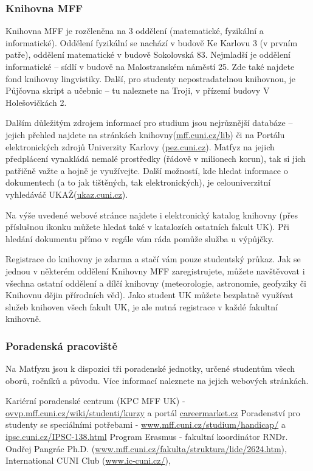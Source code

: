 \subsubsection{Knihovna MFF}
Knihovna MFF je rozčleněna na 3 oddělení (matematické, fyzikální a
informatické). Oddělení fyzikální se nachází v budově Ke Karlovu 3 (v prvním
patře), oddělení matematické v budově Sokolovská 83. Nejmladší je oddělení
informatické – sídlí v budově na Malostranském náměstí 25. Zde také najdete fond
knihovny lingvistiky. Další, pro studenty nepostradatelnou knihovnou, je
Půjčovna skript a učebnic – tu naleznete na Troji, v přízemí budovy V
Holešovičkách 2.

Dalším důležitým zdrojem informací pro studium jsou nejrůznější databáze –
jejich přehled najdete na stránkách knihovny(\url{mff.cuni.cz/lib}) či na
Portálu elektronických zdrojů
Univerzity Karlovy (\url{pez.cuni.cz}). Matfyz na jejich předplácení vynakládá
nemalé
prostředky (řádově v milionech korun), tak si jich patřičně važte a hojně je
využívejte. Další možností, kde hledat informace o dokumentech (a to jak
tištěných, tak elektronických), je celouniverzitní vyhledáváč
UKAŽ(\url{ukaz.cuni.cz}).

Na výše uvedené webové stránce najdete i elektronický katalog knihovny (přes
příslušnou ikonku můžete hledat také v katalozích ostatních fakult UK). Při
hledání dokumentu přímo v regále vám ráda pomůže služba u výpůjčky.

Registrace do knihovny je zdarma a stačí vám pouze studentský průkaz. Jak se
jednou v některém oddělení Knihovny MFF zaregistrujete, můžete navštěvovat i
všechna ostatní oddělení a dílčí knihovny (meteorologie, astronomie, geofyziky
či Knihovnu dějin přírodních věd). Jako student UK můžete bezplatně využívat
služeb knihoven všech fakult UK, je ale nutná registrace v každé fakultní
knihovně.


\subsubsection{Poradenská pracoviště}
Na Matfyzu jsou k dispozici tři poradenské jednotky, určené studentům všech
oborů, ročníků a původu. Více informací naleznete na jejich webových stránkách.

Kariérní poradenské centrum (KPC MFF UK) -
\url{ovvp.mff.cuni.cz/wiki/studenti/kurzy} a portál \url{careermarket.cz}
Poradenství pro studenty se speciálními potřebami -
\url{www.mff.cuni.cz/studium/handicap/} a \url{ipsc.cuni.cz/IPSC-138.html}
Program Erasmus - fakultní koordinátor RNDr. Ondřej Pangrác Ph.D.
(\url{www.mff.cuni.cz/fakulta/struktura/lide/2624.htm}), International CUNI Club
(\url{www.ic-cuni.cz/}),